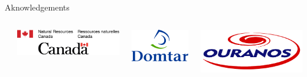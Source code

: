 \documentclass[10pt,aspectratio=149]{beamer}
\begin{document}
\begin{frame}[t]{Aknowledgements}
\begin{center}
\begin{columns}[t]
\begin{column}{0.19\linewidth}
	\end{column}
	\begin{column}{0.22\linewidth}
		\includegraphics[width=0.21\paperwidth]{Figs/logo/logo_14_CAN.png}
	\end{column}
	\begin{column}{0.17\linewidth}
		\includegraphics[width=0.12\paperwidth]{Figs/logo/logo_7_domtar.png}
	\end{column}
	\begin{column}{0.17\linewidth}
		\includegraphics[width=0.13\paperwidth]{Figs/logo/logo_9_ouranos.png}
	\end{column}
\end{columns}
\end{center}
\end{frame}

\end{document}
